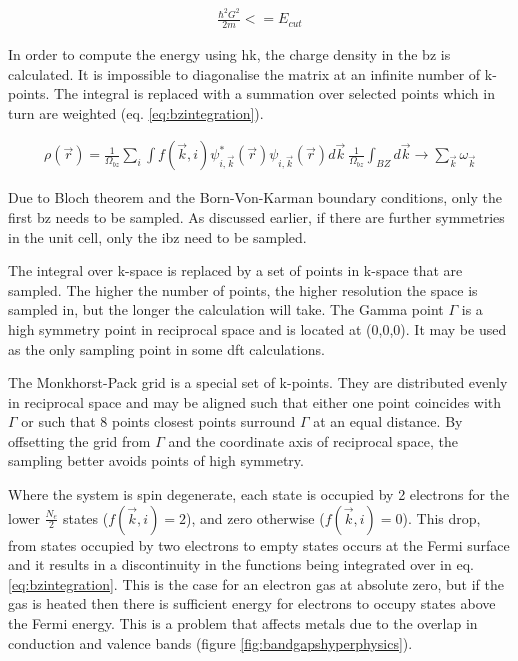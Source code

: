  \begin{equation}
   \begin{split}
     \frac{\hbar^2 G^2}{2m} <= E_{cut}
   \end{split}
   \label{eq:planewaveecutoff}
 \end{equation}


In order to compute the energy using \acrshort{hk}, the charge density in the \acrshort{bz} is calculated.  It is impossible to diagonalise the matrix at an infinite number of k-points.  The integral is replaced with a summation over selected points which in turn are weighted (eq. \ref{eq:bzintegration})\cite{bzsampling}.  

\begin{equation}
\begin{split}
\rho(\vec{r}) = \frac{1}{\Omega_{bz}} \sum_{i} \int f(\vec{k}, i) \psi^{*}_{i, \vec{k}}(\vec{r}) \psi_{i, \vec{k}} (\vec{r}) d\vec{k} \
\frac{1}{\Omega_{bz}} \int_{BZ} d\vec{k} \rightarrow \sum_{\vec{k}} \omega_{\vec{k}}
\end{split}
\label{eq:bzintegration}
\end{equation}

Due to Bloch theorem and the Born-Von-Karman boundary conditions, only the first \acrshort{bz} needs to be sampled.  As discussed earlier, if there are further symmetries in the unit cell, only the \acrshort{ibz} need to be sampled.

The integral over k-space is replaced by a set of points in k-space that are sampled.  The higher the number of points, the higher resolution the space is sampled in, but the longer the calculation will take.  The Gamma point $\Gamma$ is a high symmetry point in reciprocal space and is located at (0,0,0).  It may be used as the only sampling point in some \acrshort{dft} calculations.

The Monkhorst-Pack grid is a special set of k-points.  They are distributed evenly in reciprocal space and may be aligned such that either one point coincides with $\Gamma$ or such that 8 points closest points surround $\Gamma$ at an equal distance.  By offsetting the grid from $\Gamma$ and the coordinate axis of reciprocal space, the sampling better avoids points of high symmetry.   

Where the system is spin degenerate, each state is occupied by 2 electrons for the lower $\frac{N_e}{2}$ states ($f(\vec{k}, i) = 2$), and zero otherwise ($f(\vec{k}, i) = 0$)\cite{marzarithesis1}.  This drop, from states occupied by two electrons to empty states occurs at the Fermi surface and it results in a discontinuity in the functions being integrated over in eq. \ref{eq:bzintegration}.  This is the case for an electron gas at absolute zero, but if the gas is heated then there is sufficient energy for electrons to occupy states above the Fermi energy.  This is a problem that affects metals due to the overlap in conduction and valence bands (figure \ref{fig:bandgapshyperphysics}).

